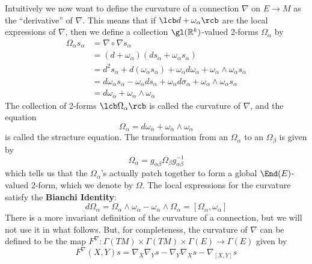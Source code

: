 Intuitively we now want to define the curvature of a connection $\nabla$ on $E \rightarrow M$ as the ``derivative'' of $\nabla$. This means that if $\lcb d + \omega_\alpha \rcb$ are the local expressions of $\nabla$, then we define a collection $\gl(\mathbb R^k)$-valued 2-forms $\Omega_\alpha$ by
\begin{align*}
\Omega_\alpha s_\alpha &= \nabla \circ \nabla s_\alpha \\
                       &= (d+\omega_\alpha)(ds_\alpha + \omega_\alpha s_\alpha) \\
                       &= d^2 s_\alpha + d(\omega_\alpha s_\alpha) + \omega_\alpha d\omega_\alpha + \omega_\alpha \wedge \omega_\alpha s_\alpha \\
                       &= d\omega_\alpha s_\alpha - \omega_\alpha ds_\alpha + \omega_\alpha d\sigma_\alpha + \omega_\alpha \wedge \omega_\alpha s_\alpha \\
                       &= d\omega_\alpha + \omega_\alpha \wedge \omega_\alpha
\end{align*}
The collection of 2-forms $\lcb \Omega_\alpha \rcb$ is called the curvature of $\nabla$, and the equation
\begin{equation}
\label{structure equation}
\Omega_\alpha = d\omega_\alpha + \omega_\alpha \wedge \omega_\alpha
\end{equation}
is called the structure equation. The transformation from an $\Omega_\alpha$ to an $\Omega_\beta$ is given by
\begin{equation}
\label{curvature 2-form transformation}
\Omega_\alpha = g_{\alpha\beta} \Omega_\beta g_{\alpha\beta}^{-1}
\end{equation}
which tells us that the $\Omega_\alpha$'s actually patch together to form a global $\End(E)$-valued 2-form, which we denote by $\Omega$. The local expressions for the curvature satisfy the \textbf{Bianchi Identity}:
\[ d\Omega_\alpha = \Omega_\alpha \wedge \omega_\alpha - \omega_\alpha \wedge \Omega_\alpha = [\Omega_\alpha,\omega_\alpha] \]
There is a more invariant definition of the curvature of a connection, but we will not use it in what follows. But, for completeness, the curvature of $\nabla$ can be defined to be the map $F^\nabla : \Gamma(TM) \times \Gamma(TM) \times \Gamma(E) \rightarrow \Gamma(E)$ given by
\[ F^\nabla(X,Y)s = \nabla_X \nabla_Y s - \nabla_Y \nabla_X s - \nabla_{[X,Y]} s \]











